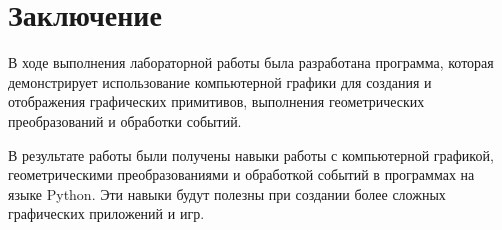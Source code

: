 \documentclass[a4paper, 14pt]{extarticle}
\begin{document}
\section{Заключение}
В ходе выполнения лабораторной работы была разработана программа, которая демонстрирует использование компьютерной графики для создания и отображения графических примитивов, выполнения геометрических преобразований и обработки событий.
\par
В результате работы были получены навыки работы с компьютерной графикой, геометрическими преобразованиями и обработкой событий в программах на языке Python. Эти навыки будут полезны при создании более сложных графических приложений и игр.
\end{document}
